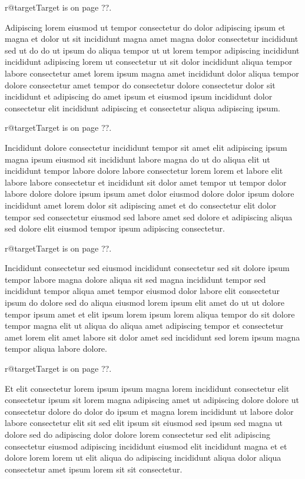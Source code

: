\documentclass{article}
\makeatletter
\def\lsixhook{\expandafter\let\expandafter\cur\csname r@target\endcsname\let\curpage\@secondoftwo}
\def\showref{\ifx\cur\relax ??\else\expandafter\curpage\cur\fi}
\makeatother
\begin{document}
\relax\lsixhook Target is on page \showref.

Adipiscing lorem eiusmod ut tempor consectetur do dolor adipiscing ipsum et magna et dolor ut sit incididunt magna amet magna dolor consectetur incididunt sed ut do do ut ipsum do aliqua tempor ut ut lorem tempor adipiscing incididunt incididunt adipiscing lorem ut consectetur ut sit dolor incididunt aliqua tempor labore consectetur amet lorem ipsum magna amet incididunt dolor aliqua tempor dolore consectetur amet tempor do consectetur dolore consectetur dolor sit incididunt et adipiscing do amet ipsum et eiusmod ipsum incididunt dolor consectetur elit incididunt adipiscing et consectetur aliqua adipiscing ipsum.

\relax\lsixhook Target is on page \showref.

Incididunt dolore consectetur incididunt tempor sit amet elit adipiscing ipsum magna ipsum eiusmod sit incididunt labore magna do ut do aliqua elit ut incididunt tempor labore dolore labore consectetur lorem lorem et labore elit labore labore consectetur et incididunt sit dolor amet tempor ut tempor dolor labore dolore dolore ipsum ipsum amet dolor eiusmod dolore dolor ipsum dolore incididunt amet lorem dolor sit adipiscing amet et do consectetur elit dolor tempor sed consectetur eiusmod sed labore amet sed dolore et adipiscing aliqua sed dolore elit eiusmod tempor ipsum adipiscing consectetur.

\relax\lsixhook Target is on page \showref.

Incididunt consectetur sed eiusmod incididunt consectetur sed sit dolore ipsum tempor labore magna dolore aliqua sit sed magna incididunt tempor sed incididunt tempor aliqua amet tempor eiusmod dolor labore elit consectetur ipsum do dolore sed do aliqua eiusmod lorem ipsum elit amet do ut ut dolore tempor ipsum amet et elit ipsum lorem ipsum lorem aliqua tempor do sit dolore tempor magna elit ut aliqua do aliqua amet adipiscing tempor et consectetur amet lorem elit amet labore sit dolor amet sed incididunt sed lorem ipsum magna tempor aliqua labore dolore.

\relax\lsixhook Target is on page \showref.

Et elit consectetur lorem ipsum ipsum magna lorem incididunt consectetur elit consectetur ipsum sit lorem magna adipiscing amet ut adipiscing dolore dolore ut consectetur dolore do dolor do ipsum et magna lorem incididunt ut labore dolor labore consectetur elit sit sed elit ipsum sit eiusmod sed ipsum sed magna ut dolore sed do adipiscing dolor dolore lorem consectetur sed elit adipiscing consectetur eiusmod adipiscing incididunt eiusmod elit incididunt magna et et dolore lorem lorem ut elit aliqua do adipiscing incididunt aliqua dolor aliqua consectetur amet ipsum lorem sit sit consectetur.
\end{document}
